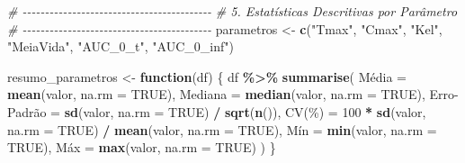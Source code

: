 \documentclass[
]{article}
\newenvironment{Shaded}{\begin{snugshade}}{\end{snugshade}}
\newcommand{\AttributeTok}[1]{\textcolor[rgb]{0.13,0.29,0.53}{#1}}
\newcommand{\CommentTok}[1]{\textcolor[rgb]{0.56,0.35,0.01}{\textit{#1}}}
\newcommand{\ConstantTok}[1]{\textcolor[rgb]{0.56,0.35,0.01}{#1}}
\newcommand{\ControlFlowTok}[1]{\textcolor[rgb]{0.13,0.29,0.53}{\textbf{#1}}}
\newcommand{\DecValTok}[1]{\textcolor[rgb]{0.00,0.00,0.81}{#1}}
\newcommand{\FunctionTok}[1]{\textcolor[rgb]{0.13,0.29,0.53}{\textbf{#1}}}
\newcommand{\NormalTok}[1]{#1}
\newcommand{\OtherTok}[1]{\textcolor[rgb]{0.56,0.35,0.01}{#1}}
\newcommand{\SpecialCharTok}[1]{\textcolor[rgb]{0.81,0.36,0.00}{\textbf{#1}}}
\newcommand{\StringTok}[1]{\textcolor[rgb]{0.31,0.60,0.02}{#1}}
\begin{document}
\begin{Shaded}
\begin{Highlighting}[]
\CommentTok{\# {-}{-}{-}{-}{-}{-}{-}{-}{-}{-}{-}{-}{-}{-}{-}{-}{-}{-}{-}{-}{-}{-}{-}{-}{-}{-}{-}{-}{-}{-}{-}{-}{-}{-}{-}{-}{-}{-}{-}{-}{-}{-}}
\CommentTok{\# 5. Estatísticas Descritivas por Parâmetro}
\CommentTok{\# {-}{-}{-}{-}{-}{-}{-}{-}{-}{-}{-}{-}{-}{-}{-}{-}{-}{-}{-}{-}{-}{-}{-}{-}{-}{-}{-}{-}{-}{-}{-}{-}{-}{-}{-}{-}{-}{-}{-}{-}{-}{-}}
\NormalTok{parametros }\OtherTok{\textless{}{-}} \FunctionTok{c}\NormalTok{(}\StringTok{"Tmax"}\NormalTok{, }\StringTok{"Cmax"}\NormalTok{, }\StringTok{"Kel"}\NormalTok{, }\StringTok{"MeiaVida"}\NormalTok{, }\StringTok{"AUC\_0\_t"}\NormalTok{, }\StringTok{"AUC\_0\_inf"}\NormalTok{)}

\NormalTok{resumo\_parametros }\OtherTok{\textless{}{-}} \ControlFlowTok{function}\NormalTok{(df) \{}
\NormalTok{  df }\SpecialCharTok{\%\textgreater{}\%}
    \FunctionTok{summarise}\NormalTok{(}
\NormalTok{      Média }\OtherTok{=} \FunctionTok{mean}\NormalTok{(valor, }\AttributeTok{na.rm =} \ConstantTok{TRUE}\NormalTok{),}
      \AttributeTok{Mediana =} \FunctionTok{median}\NormalTok{(valor, }\AttributeTok{na.rm =} \ConstantTok{TRUE}\NormalTok{),}
      \StringTok{\textasciigrave{}}\AttributeTok{Erro{-}Padrão}\StringTok{\textasciigrave{}} \OtherTok{=} \FunctionTok{sd}\NormalTok{(valor, }\AttributeTok{na.rm =} \ConstantTok{TRUE}\NormalTok{) }\SpecialCharTok{/} \FunctionTok{sqrt}\NormalTok{(}\FunctionTok{n}\NormalTok{()),}
      \StringTok{\textasciigrave{}}\AttributeTok{CV(\%)}\StringTok{\textasciigrave{}} \OtherTok{=} \DecValTok{100} \SpecialCharTok{*} \FunctionTok{sd}\NormalTok{(valor, }\AttributeTok{na.rm =} \ConstantTok{TRUE}\NormalTok{) }\SpecialCharTok{/} \FunctionTok{mean}\NormalTok{(valor, }\AttributeTok{na.rm =} \ConstantTok{TRUE}\NormalTok{),}
\NormalTok{      Mín }\OtherTok{=} \FunctionTok{min}\NormalTok{(valor, }\AttributeTok{na.rm =} \ConstantTok{TRUE}\NormalTok{),}
\NormalTok{      Máx }\OtherTok{=} \FunctionTok{max}\NormalTok{(valor, }\AttributeTok{na.rm =} \ConstantTok{TRUE}\NormalTok{)}
\NormalTok{    )}
\NormalTok{\}}


\end{Highlighting}
\end{Shaded}
\end{document}
